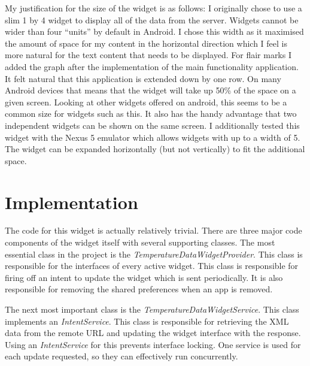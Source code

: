\documentclass[paper=a4, fontsize=11pt]{scrartcl}	%
\numberwithin{equation}{section}															%
\numberwithin{figure}{section}																%
\numberwithin{table}{section}
\begin{document}
My justification for the size of the widget is as follows: I originally chose to use a slim 1 by 4 widget to display all of the data from the server. Widgets cannot be wider than four ``units'' by default in Android. I chose this width as it maximised the amount of space for my content in the horizontal direction which I feel is more natural for the text content that needs to be displayed. For flair marks I added the graph after the implementation of the main functionality application. It felt natural that this application is extended down by one row. On many Android devices that means that the widget will take up 50\% of the space on a given screen. Looking at other widgets offered on android, this seems to be a common size for widgets such as this. It also has the handy advantage that two independent widgets can be shown on the same screen. I additionally tested this widget with the Nexus 5 emulator which allows widgets with up to a width of 5. The widget can be expanded horizontally (but not vertically) to fit the additional space.


\section{Implementation}
The code for this widget is actually relatively trivial. There are three major code components of the widget itself with several supporting classes. The most essential class in the project is the \textit{TemperatureDataWidgetProvider}. This class is responsible for the interfaces of every active widget. This class is responsible for firing off an intent to update the widget which is sent periodically. It is also responsible for removing the shared preferences when an app is removed.

The next most important class is the \textit{TemperatureDataWidgetService}. This class implements an \textit{IntentService}. This class is responsible for retrieving the XML data from the remote URL and updating the widget interface with the response. Using an \textit{IntentService} for this prevents interface locking. One service is used for each update requested, so they can effectively run concurrently.
\end{document}
